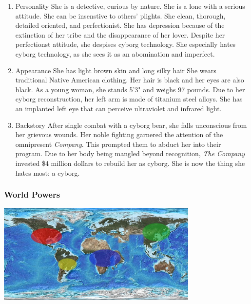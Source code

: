\documentclass[12pt]{article}
\begin{document}
\begin{enumerate}
\item Personality
\label{sec:org48038ea}
She is a detective, curious by nature. She is a lone with a serious attitude. She can be insenstive to others' plights. She clean, thorough, detailed oriented, and perfectionist. She has depression because of the extinction of her tribe and the disappearance of her lover. Despite her perfectionst attitude, she despises cyborg technology. She especially hates cyborg technology, as she sees it as an abomination and imperfect.

\item Appearance
\label{sec:org9ea383e}
She has light brown skin and long silky hair She wears traditional Native American clothing. Her hair is black and her eyes are also black. As a young woman, she stands 5'3" and weighs 97 pounds. Due to her cyborg reconstruction, her left arm is made of titanium steel alloys. She has an implanted left eye that can perceive ultraviolet and infrared light.

\item Backstory
\label{sec:orgb59be7e}
After single combat with a cyborg bear, she falls unconscious from her grievous wounds. Her noble fighting garnered the attention of the omnipresent \emph{Company}. This prompted them to abduct her into their program. Due to her body being mangled beyond recognition, \emph{The Company} invested \$4 million dollars to rebuild her as cyborg. She is now the thing she hates most: a cyborg.
\end{enumerate}

\subsubsection{World Powers}
\label{sec:org603e0f1}
\begin{center}
\includegraphics[width=10cm]{./img/world.jpg}
\end{center}
\end{document}
